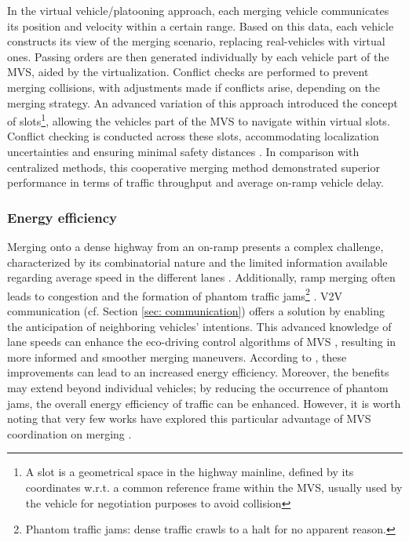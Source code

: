 In the virtual vehicle/platooning approach, each merging vehicle communicates its position and velocity within a certain range. Based on this data, each vehicle constructs its view of the merging scenario, replacing real-vehicles with virtual ones. Passing orders are then generated individually by each vehicle part of the MVS, aided by the virtualization. Conflict checks are performed to prevent merging collisions, with adjustments made if conflicts arise, depending on the merging strategy. An advanced variation of this approach introduced the concept of slots\footnote{ A slot is a geometrical space in the highway mainline, defined by its coordinates w.r.t. a common reference frame within the MVS, usually used by the vehicle for negotiation purposes to avoid collision}, allowing the vehicles part of the MVS to navigate within virtual slots. Conflict checking is conducted across these slots, accommodating localization uncertainties and ensuring minimal safety distances \cite{6338779}. In comparison with centralized methods, this cooperative merging method demonstrated superior performance in terms of traffic throughput and average on-ramp vehicle delay. %

\subsubsection{Energy efficiency} \label{sec: merging_energy_efficiency} 
Merging onto a dense highway from an on-ramp presents a complex challenge, characterized by its combinatorial nature and the limited information available regarding average speed in the different lanes \cite{7265166}. Additionally, ramp merging often leads to congestion and the formation of phantom traffic jams\footnote{Phantom traffic jams: dense traffic crawls to a halt for no apparent reason.} \cite{VAHIDI2018822}. V2V communication (cf. Section \ref{sec: communication}) offers a solution by enabling the anticipation of neighboring vehicles' intentions. This advanced knowledge of lane speeds can enhance the eco-driving control algorithms of MVS \cite{VAHIDI2018822}, resulting in more informed and smoother merging maneuvers. According to \cite{7313484} \cite{7562449}, these improvements can lead to an increased energy efficiency. Moreover, the benefits may extend beyond individual vehicles; by reducing the occurrence of phantom jams, the overall energy efficiency of traffic can be enhanced. However, it is worth noting that very few works have explored this particular advantage of MVS coordination on merging \cite{VAHIDI2018822}. %


